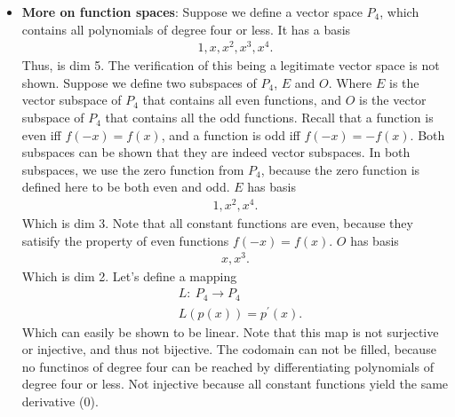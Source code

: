 \documentclass{report}
\begin{document}
\begin{itemize}
\begin{enumerate}
                \item \textbf{(Scalar closure)}: $se = s\lambda v = \lambda(sv)$, thus $se \in E_{\lambda$
                \item \textbf{(Addition closure)}: $e + \hat{e} = \lambda e + \lambda \hat{e} = \lambda(e+\hat{e})$, thus $e + \hat{e} \ in E_{\lambda} $
            \end{enumerate}
        \item \textbf{More on function spaces}: Suppose we define a vector space $P_{4}$, which contains all polynomials of degree four or less. It has a basis
            \begin{align*}
                1, x, x^{2}, x^{3}, x^{4}
            .\end{align*}
            Thus, is dim 5. The verification of this being a legitimate vector space is not shown. Suppose we define two subspaces of $P_{4}$, $E$ and $O$. Where $E$ is the vector subspace of $P_{4}$ that contains all even functions, and $O$ is the vector subspace of $P_{4}$ that contains all the odd functions. Recall that a function is even iff $f(-x) = f(x)$, and a function is odd iff $f(-x)  = -f(x)$. Both subspaces can be shown that they are indeed vector subspaces. In both subspaces, we use the zero function from $P_{4}$, because the zero function is defined here to be both even and odd. 
            \bigbreak \noindent 
            $E$ has basis
            \begin{align*}
                1, x^{2}, x^{4}
            .\end{align*}
            Which is dim 3. Note that all constant functions are even, because they satisify the property of even functions $f(-x) = f(x)$.
            \bigbreak \noindent 
            $O$ has basis
            \begin{align*}
                x, x^{3}
            .\end{align*}
            Which is dim 2. Let's define a mapping
            \begin{align*}
                &L:\ P_{4} \to P_{4} \\
                &L(p(x)) = p^{\prime}(x)
            .\end{align*}
            Which can easily be shown to be linear. Note that this map is not surjective or injective, and thus not bijective. The codomain can not be filled, because no functinos of degree four can be reached by differentiating polynomials of degree four or less. Not injective because all constant functions yield the same derivative (0).

\end{itemize}
\end{document}
